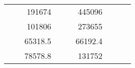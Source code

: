 \begin{table}[H]
\begin{tabular}{|ccrccrccc}
\multicolumn{1}{|c|}{\cellcolor[HTML]{FFFFC7}}                                & \multicolumn{1}{c|}{\cellcolor[HTML]{DDFDFF}}                      & \multicolumn{1}{r|}{\cellcolor[HTML]{DAE8FC}191674}    & \multicolumn{1}{c|}{\cellcolor[HTML]{FFFFC7}}                                & \multicolumn{1}{c|}{\cellcolor[HTML]{DDFDFF}}                       & \multicolumn{1}{r|}{\cellcolor[HTML]{DDFDFF}445096}    &                                                                              &                                                                    &                                                        \\ \cline{3-3} \cline{6-6}
\multicolumn{1}{|c|}{\cellcolor[HTML]{FFFFC7}}                                & \multicolumn{1}{c|}{\cellcolor[HTML]{DDFDFF}}                      & \multicolumn{1}{r|}{\cellcolor[HTML]{DDFDFF}101806}    & \multicolumn{1}{c|}{\cellcolor[HTML]{FFFFC7}}                                & \multicolumn{1}{c|}{\cellcolor[HTML]{DDFDFF}}                       & \multicolumn{1}{r|}{\cellcolor[HTML]{DAE8FC}273655}    &                                                                              &                                                                    &                                                        \\ \cline{3-3} \cline{6-6}
\multicolumn{1}{|c|}{\cellcolor[HTML]{FFFFC7}}                                & \multicolumn{1}{c|}{\cellcolor[HTML]{DDFDFF}}                      & \multicolumn{1}{r|}{\cellcolor[HTML]{DAE8FC}65318.5}   & \multicolumn{1}{c|}{\cellcolor[HTML]{FFFFC7}}                                & \multicolumn{1}{c|}{\cellcolor[HTML]{DDFDFF}}                       & \multicolumn{1}{r|}{\cellcolor[HTML]{DDFDFF}66192.4}   &                                                                              &                                                                    &                                                        \\ \cline{3-3} \cline{6-6}
\multicolumn{1}{|c|}{\cellcolor[HTML]{FFFFC7}}                                & \multicolumn{1}{c|}{\cellcolor[HTML]{DDFDFF}}                      & \multicolumn{1}{r|}{\cellcolor[HTML]{DDFDFF}78578.8}   & \multicolumn{1}{c|}{\cellcolor[HTML]{FFFFC7}}                                & \multicolumn{1}{c|}{\cellcolor[HTML]{DDFDFF}}                       & \multicolumn{1}{r|}{\cellcolor[HTML]{DAE8FC}131752}    &                                                                              &                                                                    &                                                        \\ \cline{3-3} \cline{6-6}

\end{tabular}
\end{table}
